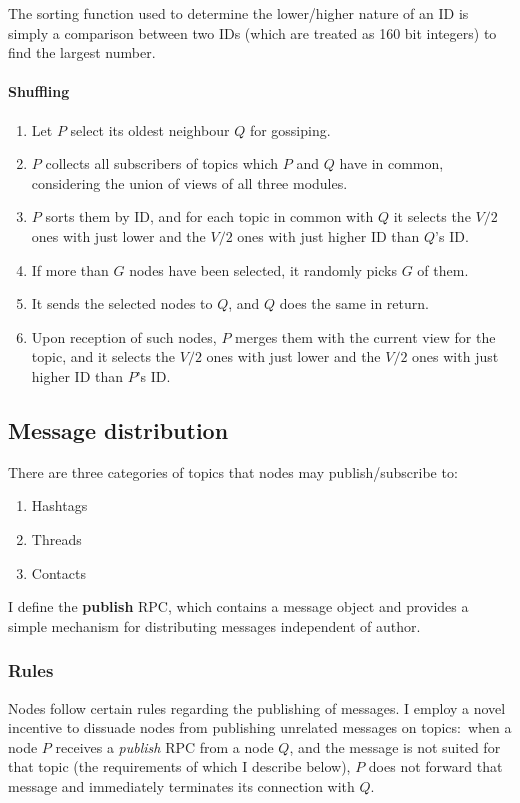 \documentclass[10pt,a4paper,onecolumn]{article}
\begin{document}
The sorting function used to determine the lower/higher nature of an ID is simply a comparison between two IDs (which are treated as 160 bit integers) to find the largest number.

\paragraph*{Shuffling}
\begin{enumerate}
\item Let $P$ select its oldest neighbour $Q$ for gossiping.
\item $P$ collects all subscribers of topics which $P$ and $Q$ have in common, considering the union of views of all three modules.
\item $P$ sorts them by ID, and for each topic in common with $Q$ it selects the $V/2$ ones with just lower and the $V/2$ ones with just higher ID than $Q$'s ID. 
\item If more than $G$ nodes have been selected, it randomly picks $G$ of them.
\item It sends the selected nodes to $Q$, and $Q$ does the same in return.
\item Upon reception of such nodes, $P$ merges them with the current view for the topic, and it selects the $V/2$ ones with just lower and the $V/2$ ones with just higher ID than $P$'s ID.
\end{enumerate}

\subsection{Message distribution}
There are three categories of topics that nodes may publish/subscribe to:
\begin{enumerate}
\item Hashtags
\item Threads
\item Contacts
\end{enumerate}

I define the \textbf{publish} RPC, which contains a message object and provides a simple mechanism for distributing messages independent of author. 

\subsubsection*{Rules}
Nodes follow certain rules regarding the publishing of messages. I employ a novel incentive to dissuade nodes from publishing unrelated messages on topics:~when a node $P$ receives a \emph{publish} RPC from a node $Q$, and the message is not suited for that topic (the requirements of which I describe below), $P$ does not forward that message and immediately terminates its connection with $Q$.  
\end{document}
